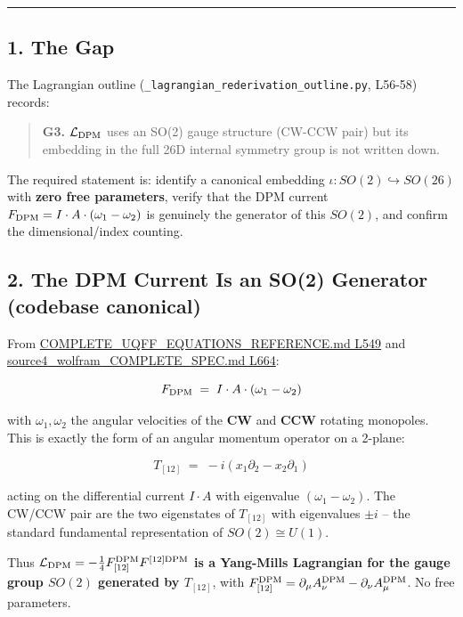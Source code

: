 \documentclass[
]{article}
\begin{document}
\begin{center}\rule{0.5\linewidth}{0.5pt}\end{center}

\subsection{1. The Gap}\label{the-gap}

The Lagrangian outline (\texttt{\_lagrangian\_rederivation\_outline.py},
L56-58) records:

\begin{quote}
\textbf{G3.} \(\mathcal{L}_{\rm DPM}\) uses an SO(2) gauge structure
(CW-CCW pair) but its embedding in the full 26D internal symmetry group
is not written down.
\end{quote}

The required statement is: identify a canonical embedding
\(\iota: SO(2) \hookrightarrow SO(26)\) with \textbf{zero free
parameters}, verify that the DPM current
\(F_{\rm DPM} = I\cdot A\cdot(\omega_1-\omega_2)\) is genuinely the
generator of this \(SO(2)\), and confirm the dimensional/index counting.

\subsection{2. The DPM Current Is an SO(2) Generator (codebase
canonical)}\label{the-dpm-current-is-an-so2-generator-codebase-canonical}

From
\href{COMPLETE_UQFF_EQUATIONS_REFERENCE.md\#L549}{COMPLETE\_UQFF\_EQUATIONS\_REFERENCE.md
L549} and
\href{source4_wolfram_COMPLETE_SPEC.md\#L664}{source4\_wolfram\_COMPLETE\_SPEC.md
L664}:

\[F_{\rm DPM} \;=\; I \cdot A \cdot (\omega_1 - \omega_2)\]

with \(\omega_1, \omega_2\) the angular velocities of the \textbf{CW}
and \textbf{CCW} rotating monopoles. This is exactly the form of an
angular momentum operator on a 2-plane:

\[T_{[12]} \;=\; -i(x_1 \partial_2 - x_2 \partial_1)\]

acting on the differential current \(I\cdot A\) with eigenvalue
\((\omega_1 - \omega_2)\). The CW/CCW pair are the two eigenstates of
\(T_{[12]}\) with eigenvalues \(\pm i\) -- the standard fundamental
representation of \(SO(2)\cong U(1)\).

Thus
\textbf{\(\mathcal{L}_{\rm DPM} = -\tfrac{1}{4}F_{[12]}^{\rm DPM} F^{[12]\rm DPM}\)
is a Yang-Mills Lagrangian for the gauge group \(SO(2)\) generated by
\(T_{[12]}\)}, with
\(F_{[12]}^{\rm DPM} = \partial_\mu A_\nu^{\rm DPM} - \partial_\nu A_\mu^{\rm DPM}\).
No free parameters.
\end{document}
